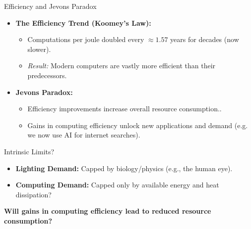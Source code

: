 \documentclass[aspectratio=169]{beamer}
\begin{document}
\begin{frame}{Efficiency and Jevons Paradox}

    \begin{itemize}
        \item \textbf{The Efficiency Trend (Koomey's Law):}
        \begin{itemize}
            \item Computations per joule doubled every $\approx 1.57$ years for decades (now slower).
            \item \textit{Result:} Modern computers are vastly more efficient than their predecessors.
        \end{itemize}

        \vspace{0.3cm} %

        \item \textbf{Jevons Paradox:}
        \begin{itemize}
            \item Efficiency improvements increase overall resource consumption..
            \item Gains in computing efficiency unlock new applications and demand (e.g. we now use AI for internet searches).
        \end{itemize}
    \end{itemize}


    \begin{block}{Intrinsic Limits?}
        \begin{itemize}
            \item \textbf{Lighting Demand:} Capped by biology/physics (e.g., the human eye).
            \item \textbf{Computing Demand:} Capped only by available energy and heat dissipation?
        \end{itemize}
        \centering
    \end{block}
    \textbf{Will gains in computing efficiency lead to reduced resource consumption?}


\end{frame}
\end{document}
